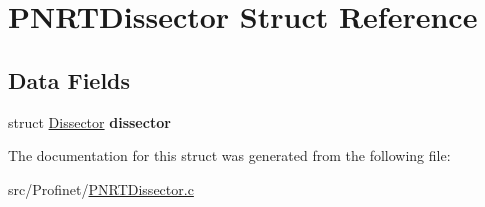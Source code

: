 \hypertarget{struct_p_n_r_t_dissector}{}\section{P\+N\+R\+T\+Dissector Struct Reference}
\label{struct_p_n_r_t_dissector}
\subsection*{Data Fields}
\begin{DoxyCompactItemize}
\item 
\hypertarget{struct_p_n_r_t_dissector_a2ec7a75e801e4a714f32310cdf37546f}{}struct \hyperlink{struct_dissector}{Dissector} {\bfseries dissector}\label{struct_p_n_r_t_dissector_a2ec7a75e801e4a714f32310cdf37546f}

\end{DoxyCompactItemize}


The documentation for this struct was generated from the following file\+:\begin{DoxyCompactItemize}
\item 
src/\+Profinet/\hyperlink{_p_n_r_t_dissector_8c}{P\+N\+R\+T\+Dissector.\+c}\end{DoxyCompactItemize}

